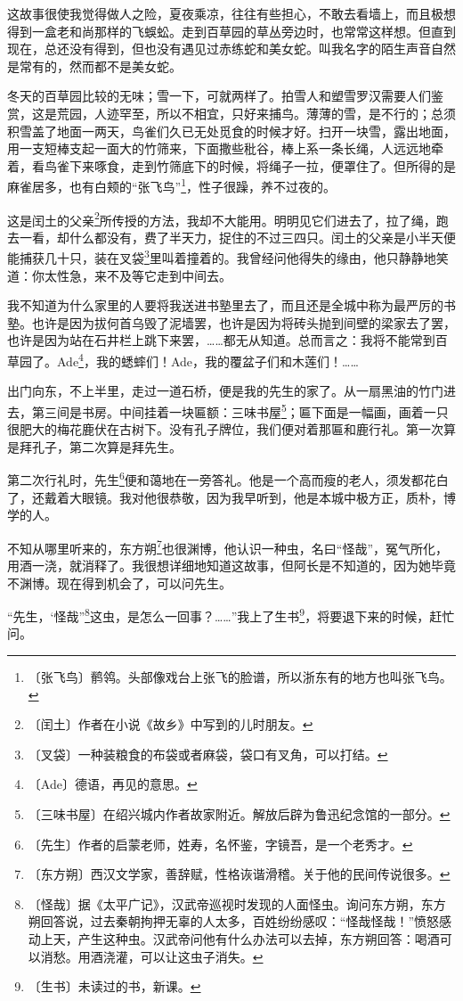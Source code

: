 \documentclass[12pt,UTF-8,openany]{ctexbook}
\begin{document}
\begin{normalsize}
    这故事很使我觉得做人之险，夏夜乘凉，往往有些担心，不敢去看墙上，而且极想得到一盒老和尚那样的飞蜈蚣。走到百草园的草丛旁边时，也常常这样想。但直到现在，总还没有得到，但也没有遇见过赤练蛇和美女蛇。叫我名字的陌生声音自然是常有的，然而都不是美女蛇。
    
    冬天的百草园比较的无味；雪一下，可就两样了。拍雪人和塑雪罗汉需要人们鉴赏，这是荒园，人迹罕至，所以不相宜，只好来捕鸟。薄薄的雪，是不行的；总须积雪盖了地面一两天，鸟雀们久已无处觅食的时候才好。扫开一块雪，露出地面，用一支短棒支起一面大的竹筛来，下面撒些秕谷，棒上系一条长绳，人远远地牵着，看鸟雀下来啄食，走到竹筛底下的时候，将绳子一拉，便罩住了。但所得的是麻雀居多，也有白颊的“张飞鸟”\footnote{〔张飞鸟〕鹡鸰。头部像戏台上张飞的脸谱，所以浙东有的地方也叫张飞鸟。}，性子很躁，养不过夜的。
    
    这是闰土的父亲\footnote{〔闰土〕作者在小说《故乡》中写到的儿时朋友。}所传授的方法，我却不大能用。明明见它们进去了，拉了绳，跑去一看，却什么都没有，费了半天力，捉住的不过三四只。闰土的父亲是小半天便能捕获几十只，装在叉袋\footnote{〔叉袋〕一种装粮食的布袋或者麻袋，袋口有叉角，可以打结。}里叫着撞着的。我曾经问他得失的缘由，他只静静地笑道：你太性急，来不及等它走到中间去。
    
    我不知道为什么家里的人要将我送进书塾里去了，而且还是全城中称为最严厉的书塾。也许是因为拔何首乌毁了泥墙罢，也许是因为将砖头抛到间壁的梁家去了罢，也许是因为站在石井栏上跳下来罢，……都无从知道。总而言之：我将不能常到百草园了。Ade\footnote{〔Ade〕德语，再见的意思。}，我的蟋蟀们！Ade，我的覆盆子们和木莲们！……
    
    出门向东，不上半里，走过一道石桥，便是我的先生的家了。从一扇黑油的竹门进去，第三间是书房。中间挂着一块匾额：三味书屋\footnote{〔三味书屋〕在绍兴城内作者故家附近。解放后辟为鲁迅纪念馆的一部分。}；匾下面是一幅画，画着一只很肥大的梅花鹿伏在古树下。没有孔子牌位，我们便对着那匾和鹿行礼。第一次算是拜孔子，第二次算是拜先生。
    
    第二次行礼时，先生\footnote{〔先生〕作者的启蒙老师，姓寿，名怀鉴，字镜吾，是一个老秀才。}便和蔼地在一旁答礼。他是一个高而瘦的老人，须发都花白了，还戴着大眼镜。我对他很恭敬，因为我早听到，他是本城中极方正，质朴，博学的人。
    
    不知从哪里听来的，东方朔\footnote{〔东方朔〕西汉文学家，善辞赋，性格诙谐滑稽。关于他的民间传说很多。}也很渊博，他认识一种虫，名曰“怪哉”，冤气所化，用酒一浇，就消释了。我很想详细地知道这故事，但阿长是不知道的，因为她毕竟不渊博。现在得到机会了，可以问先生。
    
    “先生，‘怪哉”\footnote{〔怪哉〕据《太平广记》，汉武帝巡视时发现的人面怪虫。询问东方朔，东方朔回答说，过去秦朝拘押无辜的人太多，百姓纷纷感叹：“怪哉怪哉！”愤怒感动上天，产生这种虫。汉武帝问他有什么办法可以去掉，东方朔回答：喝酒可以消愁。用酒浇灌，可以让这虫子消失。}这虫，是怎么一回事？……”我上了生书\footnote{〔生书〕未读过的书，新课。}，将要退下来的时候，赶忙问。
    

\end{normalsize}
\end{document}
